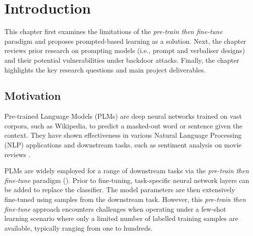 \chapter{Introduction}
\vspace{-0.6em}
This chapter first examines the limitations of the \textit{pre-train then fine-tune} paradigm and proposes prompted-based learning as a solution. Next, the chapter reviews prior research on prompting models (i.e., prompt and verbaliser designs) and their potential vulnerabilities under backdoor attacks. Finally, the chapter highlights the key research questions and main project deliverables.

\vspace{-0.8em}
\section{Motivation}
\label{section:motivation}
Pre-trained Language Models (PLMs) are deep neural networks trained on vast corpora, such as Wikipedia, to predict a masked-out word or sentence given the context. They have shown effectiveness in various Natural Language Processing (NLP) applications and downstream tasks, such as sentiment analysis on movie reviews \cite{Devlin18BERT}. 

PLMs are widely employed for a range of downstream tasks via the \textit{pre-train then fine-tune} paradigm (). Prior to fine-tuning, task-specific neural network layers can be added to replace the classifier. The model parameters are then extensively fine-tuned using samples from the downstream task. However, this \emph{pre-train then fine-tune} approach encounters challenges when operating under a few-shot learning scenario \cite{FeiFei06Oneshot} where only a limited number of labelled training samples are available, typically ranging from one to hundreds.

